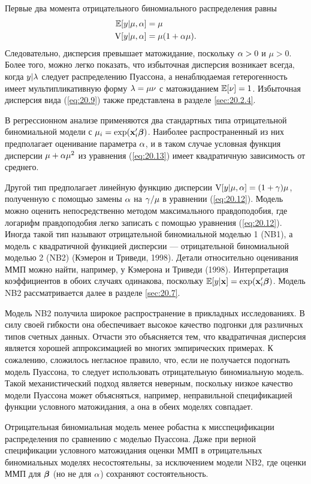 Первые два момента отрицательного биномиального распределения равны
    \begin{align}\label{eq:20.13}
    \mathbb{E}[y|\mu, \alpha] &= \mu \\
    \mathrm{V}[y|\mu, \alpha] &= \mu(1 + \alpha\mu). \notag
    \end{align}
Следовательно, дисперсия превышает матожидание, поскольку $\alpha > 0$ и $\mu > 0$. Более того, можно легко показать, что избыточная дисперсия возникает всегда, когда $y|\lambda$ следует распределению Пуассона, а ненаблюдаемая гетерогенность имеет мультипликативную форму $\lambda = \mu\nu$ с матожиданием $\mathbb{E}[\nu] = 1$. Избыточная дисперсия вида (\ref{eq:20.9}) также представлена в разделе \ref{sec:20.2.4}.

В регрессионном анализе применяются два стандартных типа отрицательной биномиальной модели с $\mu_i = \exp(\mathbf{x}_i'\bm{\beta})$.
Наиболее распространенный из них предполагает оценивание параметра $\alpha$, и в таком случае условная функция дисперсии $\mu + \alpha \mu ^2$ из уравнения (\ref{eq:20.13}) имеет квадратичную зависимость от среднего.

Другой тип предполагает линейную функцию дисперсии $\mathrm{V}[y|\mu, \alpha] = (1 + \gamma)\mu$, полученную с помощью замены $\alpha$ на $\gamma/\mu$ в уравнении (\ref{eq:20.12}). Модель можно оценить непосредственно методом максимального правдоподобия, где логарифм правдоподобия легко записать с помощью уравнения (\ref{eq:20.12}). Иногда такой тип называют отрицательной биномиальной моделью 1 (NB1), а модель с квадратичной функцией дисперсии --- отрицательной биномиальной моделью 2 (NB2) (Кэмерон и Триведи, 1998). Детали относительно оценивания ММП можно найти, например, у Кэмерона и Триведи (1998). Интерпретация коэффициентов в обоих случаях одинакова, поскольку $\mathbb{E}[y|\mathbf{x}] = \exp(\mathbf{x}_i'\bm{\beta})$. Модель NB2 рассматривается далее в разделе \ref{sec:20.7}.

Модель NB2 получила широкое распространение в прикладных исследованиях. В силу своей гибкости она обеспечивает высокое качество подгонки для различных типов счетных данных. Отчасти это объясняется тем, что квадратичная дисперсия является хорошей аппроксимацией во многих эмпирических примерах. К сожалению, сложилось негласное правило, что, если не получается подогнать модель Пуассона, то следует использовать отрицательную биномиальную модель. Такой механистический подход является неверным, поскольку низкое качество модели Пуассона может объясняться, например, неправильной спецификацией функции условного матожидания, а она в обеих моделях совпадает.

Отрицательная биномиальная модель менее робастна к мисспецификации распределения по сравнению с моделью Пуассона. Даже при верной спецификации условного матожидания оценки ММП в отрицательных биномиальных моделях несостоятельны, за исключением модели NB2, где оценки ММП для $\bm{\beta}$ (но не для $\alpha$) сохраняют состоятельность.

